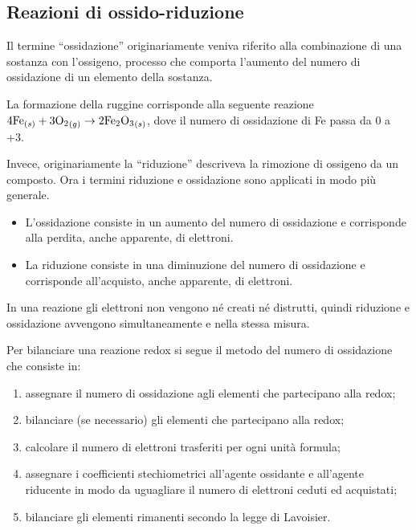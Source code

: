 \subsection{Reazioni di ossido-riduzione}
Il termine ``ossidazione'' originariamente veniva riferito alla combinazione di una sostanza con l'ossigeno, processo che comporta l'aumento del numero di ossidazione di un elemento della sostanza.
\begin{ex}
    La formazione della ruggine corrisponde alla seguente reazione $4\textnormal{Fe}_{\left(s\right)}+3{\textnormal{O}_2}_{\left(g\right)}\to2\textnormal{Fe}_2{\textnormal{O}_3}_{\left(s\right)}$, dove il numero di ossidazione di Fe passa da 0 a +3.
\end{ex}
Invece, originariamente la ``riduzione'' descriveva la rimozione di ossigeno da un composto. Ora i termini riduzione e ossidazione sono applicati in modo più generale.
\begin{defn}\hfill
    \begin{itemize}
        \item L'ossidazione consiste in un aumento del numero di ossidazione e corrisponde alla perdita, anche apparente, di elettroni.
        \item La riduzione consiste in una diminuzione del numero di ossidazione e corrisponde all'acquisto, anche apparente, di elettroni.
    \end{itemize}
\end{defn}
In una reazione gli elettroni non vengono né creati né distrutti, quindi riduzione e ossidazione avvengono simultaneamente e nella stessa misura.
\begin{axiom}
    Per bilanciare una reazione redox si segue il metodo del numero di ossidazione che consiste in:
    \begin{enumerate}
        \item assegnare il numero di ossidazione agli elementi che partecipano alla redox;
        \item bilanciare (se necessario) gli elementi che partecipano alla redox;
        \item calcolare il numero di elettroni trasferiti per ogni unità formula;
        \item assegnare i coefficienti stechiometrici all'agente ossidante e all'agente riducente in modo da uguagliare il numero di elettroni ceduti ed acquistati;
        \item bilanciare gli elementi rimanenti secondo la legge di Lavoisier.
    \end{enumerate}
\end{axiom}
